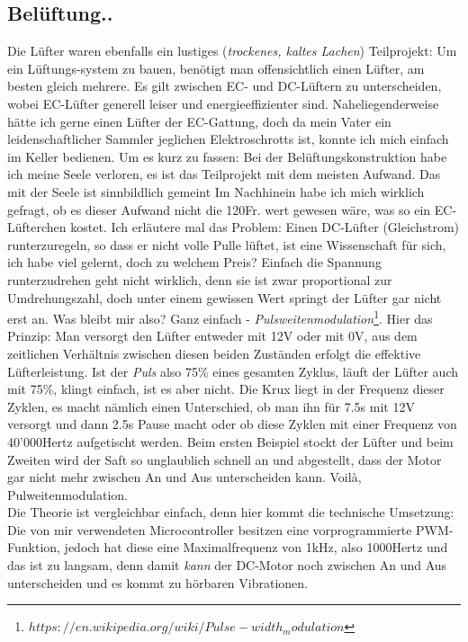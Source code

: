 \documentclass[12pt,titlepage,a4paper]{article}
\begin{document}
\subsection{Belüftung..}
Die Lüfter waren ebenfalls ein lustiges (\textit{trockenes, kaltes Lachen}) Teilprojekt: Um ein Lüftungs-system zu bauen, benötigt man offensichtlich einen Lüfter, am besten gleich mehrere. Es gilt zwischen EC- und DC-Lüftern zu unterscheiden, wobei EC-Lüfter generell leiser und energieeffizienter sind. Naheliegenderweise hätte ich gerne einen Lüfter der EC-Gattung, doch da mein Vater ein leidenschaftlicher Sammler jeglichen Elektroschrotts ist, konnte ich mich einfach im Keller bedienen. Um es kurz zu fassen: Bei der Belüftungskonstruktion habe ich meine Seele verloren, es ist das Teilprojekt mit dem meisten Aufwand. Das mit der Seele ist sinnbildlich gemeint Im Nachhinein habe ich mich wirklich gefragt, ob es dieser Aufwand nicht die 120Fr. wert gewesen wäre, was so ein EC-Lüfterchen kostet. Ich erläutere mal das Problem: Einen DC-Lüfter (Gleichstrom) runterzuregeln, so dass er nicht volle Pulle lüftet, ist eine Wissenschaft für sich, ich habe viel gelernt, doch zu welchem Preis? Einfach die Spannung runterzudrehen geht nicht wirklich, denn sie ist zwar proportional zur Umdrehungszahl, doch unter einem gewissen Wert springt der Lüfter gar nicht erst an. Was bleibt mir also? Ganz einfach - \textit{Pulsweitenmodulation}\footnote{$https://en.wikipedia.org/wiki/Pulse-width_modulation$}. 
Hier das Prinzip: Man versorgt den Lüfter entweder mit 12V oder mit 0V, aus dem zeitlichen Verhältnis zwischen diesen beiden Zuständen erfolgt die effektive Lüfterleistung. Ist der \textit{Puls} also 75\% eines gesamten Zyklus, läuft der Lüfter auch mit 75\%, klingt einfach, ist es aber nicht. Die Krux liegt in der Frequenz dieser Zyklen, es macht nämlich einen Unterschied, ob man ihn für 7.5s mit 12V versorgt und dann 2.5s Pause macht oder ob diese Zyklen mit einer Frequenz von 40'000Hertz aufgetischt werden. Beim ersten Beispiel stockt der Lüfter und beim Zweiten wird der Saft so unglaublich schnell an und abgestellt, dass der Motor gar nicht mehr zwischen An und Aus unterscheiden kann. Voilà, Pulweitenmodulation. \\ Die Theorie ist vergleichbar einfach, denn hier kommt die technische Umsetzung: Die von mir verwendeten Microcontroller besitzen eine vorprogrammierte PWM-Funktion, jedoch hat diese eine Maximalfrequenz von 1kHz, also 1000Hertz und das ist zu langsam, denn damit \textit{kann} der DC-Motor noch zwischen An und Aus unterscheiden und es kommt zu hörbaren Vibrationen. 
\end{document}
